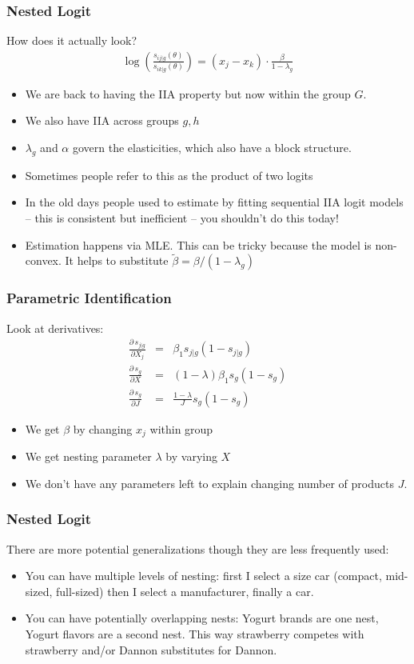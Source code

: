 \documentclass[xcolor=pdftex,dvipsnames,table,mathserif,aspectratio=169]{beamer}
\begin{document}
\begin{frame}
\frametitle{Nested Logit}
How does it actually look?
\begin{eqnarray*}
\log \left(\frac{s_{ij|g}(\theta)}{s_{ik|g}(\theta)} \right) = (x_j -x_k)\cdot \frac{\beta}{1-\lambda_g}
 \end{eqnarray*}
 \begin{itemize}
\item We are back to having the IIA property but now within the group $G$.
\item We also have IIA across groups $g,h$
\item $\lambda_g$ and $\alpha$ govern the elasticities, which also have a block structure. %
\item Sometimes people refer to this as the \alert{product of two logits}
\item In the old days people used to estimate by fitting sequential IIA logit models -- this is consistent but inefficient -- you shouldn't do this today!
\item Estimation happens via MLE. This can be tricky because the model is non-convex. It helps to substitute $\tilde{\beta} = \beta/(1-\lambda_g)$
 \end{itemize}
\end{frame}

\begin{frame}
\frametitle{Parametric Identification}

Look at derivatives:
\begin{eqnarray*}
\frac{\partial\, s_{j|g}}{\partial X_j} &=& \beta_1 s_{j|g}(1-s_{j|g}) \\
 \frac{\partial\, s_{g}}{\partial X} &=& (1-\lambda) \beta_1 s_{g}(1-s_{g}) \\
  \frac{\partial\, s_{g}}{\partial J} &=& \frac{1-\lambda}{J} s_{g}(1-s_{g})
\end{eqnarray*}
\begin{itemize}
\item We get $\beta$ by changing $x_j$ within group
\item We get nesting parameter $\lambda$ by varying $X$
\item We don't have any parameters left to explain changing number of products $J$.
\end{itemize}

\end{frame}



\begin{frame}
\frametitle{Nested Logit}
There are more potential generalizations though they are less frequently used:
 \begin{itemize}
\item You can have multiple levels of nesting: first I select a size car (compact, mid-sized, full-sized) then I select a manufacturer, finally a car.
\item You can have potentially overlapping nests: Yogurt brands are one nest, Yogurt flavors are a second nest. This way strawberry competes with strawberry and/or Dannon substitutes for Dannon.
 \end{itemize}
\end{frame}
\end{document}
